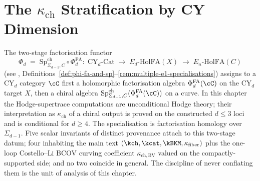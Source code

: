 \providecommand{\PhiFA}{\Phi^{\mathrm{FA}}}
\providecommand{\HolFA}{\mathrm{HolFA}}
\providecommand{\EdHolFA}{E_d\text{-}\HolFA}
\providecommand{\EnHolFA}{E_n\text{-}\HolFA}
\providecommand{\SpCh}{\mathrm{Sp}^{\mathrm{ch}}}
\providecommand{\intSigma}{\textstyle\int_{\Sigma_{d-1}}}
\providecommand{\hCS}{\mathrm{hCS}}
\providecommand{\kchBV}{\kappa_{\mathrm{ch,BV}}}
\providecommand{\kfiber}{\kappa_{\mathrm{fiber}}}

\chapter{The \texorpdfstring{$\kappa_{\mathrm{ch}}$}{kappa-ch} Stratification by CY Dimension}
\label{ch:cy-d-kappa-stratification}

The two-stage factorisation functor
\[
 \Phi_d \;=\; \SpCh_{\Sigma_{d-1}, C} \circ \PhiFA_d
 \colon\; \mathrm{CY}_d\text{-}\mathrm{Cat}
 \;\longrightarrow\; \EdHolFA(X)
 \;\longrightarrow\; \EnHolFA(C)
\]
(see \cite{VolI},
Definitions~\ref{def:phi-fa-and-sp}--\ref{rem:multiple-e1-specialisations})
assigns to a CY$_d$ category $\cC$ first a holomorphic factorisation
algebra $\PhiFA_d(\cC)$ on the CY$_d$ target $X$, then a chiral algebra
\(\SpCh_{\Sigma_{d-1},C}(\PhiFA_d(\cC))\) on a curve. In this chapter
the Hodge-supertrace computations are unconditional Hodge theory; their
interpretation as \(\kappa_{\mathrm{ch}}\) of a chiral output is proved on
the constructed \(d\leq 3\) loci and is conditional for \(d\geq 4\).
The specialisation is factorisation homology over \(\Sigma_{d-1}\).
Five scalar invariants of distinct
provenance attach to this two-stage datum; four inhabiting the
main text $(\kch, \kcat, \kBKM, \kfiber)$ plus the one-loop
Costello--Li BCOV curving coefficient $\kchBV$ valued on the
compactly-supported side; and no two coincide in general. The
discipline of never conflating them is the unit of analysis of this
chapter.

